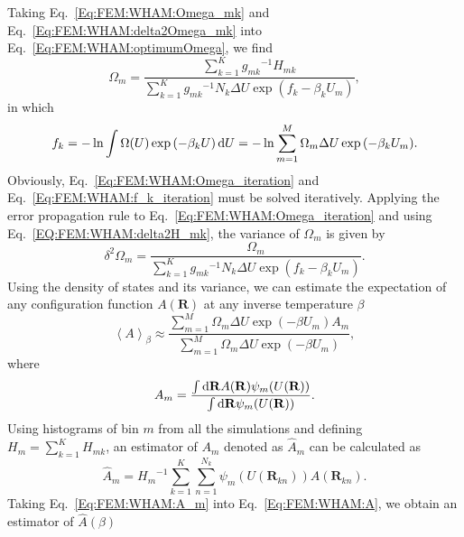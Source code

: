 Taking Eq.~\ref{Eq:FEM:WHAM:Omega_mk} and Eq.~\ref{Eq:FEM:WHAM:delta2Omega_mk} into Eq.~\ref{Eq:FEM:WHAM:optimumOmega}, we find
\begin{equation}
\Omega_m=\frac{\sum\limits_{k=1}^{K}{g_{mk}}^{-1}H_{mk}}{\sum\limits_{k=1}^{K}{g_{mk}}^{-1}N_k\Delta U\exp{(f_k-\beta_kU_m)}},
\label{Eq:FEM:WHAM:Omega_iteration}
\end{equation}
in which
\begin{equation}
f_k=-\ln \int \Omega(U)\exp{(-\beta_k U)}\mathop{}\!\mathrm{d} U=-\ln\sum\limits_{m=1}^M\Omega_m\Delta U\exp{(-\beta_kU_m)}.
\label{Eq:FEM:WHAM:f_k_iteration}
\end{equation}
Obviously, Eq.~\ref{Eq:FEM:WHAM:Omega_iteration} and Eq.~\ref{Eq:FEM:WHAM:f_k_iteration} must be solved iteratively.
Applying the error propagation rule to Eq.~\ref{Eq:FEM:WHAM:Omega_iteration} and using Eq.~\ref{EQ:FEM:WHAM:delta2H_mk}, the variance of $\Omega_m$ is given by
\begin{equation}
\delta^2 \Omega_m=\frac{\Omega_m}{\sum\limits_{k=1}^K{g_{mk}}^{-1}N_k\Delta U\exp{(f_k-\beta_kU_m)}}.
\end{equation}
Using the density of states and its variance, we can estimate the expectation of any configuration function $A(\mathbf{R})$ at any inverse temperature $\beta$
\begin{equation}
\left<A\right>_\beta\approx\frac{\sum\limits_{m=1}^M\Omega_m\Delta U\exp{(-\beta U_m)}A_m}{\sum\limits_{m=1}^M\Omega_m\Delta U\exp{(-\beta U_m)}},
\label{Eq:FEM:WHAM:A}
\end{equation}
where
\begin{equation}
A_m=\frac{\int \mathop{}\!\mathrm{d}\mathbf{R}A(\mathbf{R})\psi_m(U(\mathbf{R}))}{\int \mathop{}\!\mathrm{d}\mathbf{R}\psi_m(U(\mathbf{R}))}.
\end{equation}
Using histograms of bin $m$ from all the simulations and defining $H_m=\sum\limits_{k=1}^KH_{mk}$, an estimator of $A_m$ denoted as $\hat{A}_m$ can be calculated as
\begin{equation}
   \hat{A}_m={H_{m}}^{-1}\sum\limits_{k=1}^K\sum\limits_{n=1}^{N_k}\psi_m(U(\mathbf{R}_{kn}))A(\mathbf{R}_{kn}).
   \label{Eq:FEM:WHAM:A_m}
\end{equation}
Taking Eq.~\ref{Eq:FEM:WHAM:A_m} into Eq.~\ref{Eq:FEM:WHAM:A}, we obtain an estimator of $\hat{A}(\beta)$
